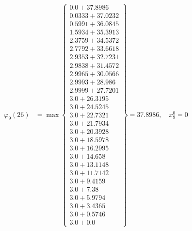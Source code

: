 \documentclass{article}
\begin{document}
\begin{align*}
  
\varphi_{9}(26) &= \max \left\{ \begin{array}{c}
0.0 + 37.8986 \\
 0.0333 + 37.0232 \\
 0.5991 + 36.0845 \\
 1.5934 + 35.3913 \\
 2.3759 + 34.5372 \\
 2.7792 + 33.6618 \\
 2.9353 + 32.7231 \\
 2.9838 + 31.4572 \\
 2.9965 + 30.0566 \\
 2.9993 + 28.986 \\
 2.9999 + 27.7201 \\
 3.0 + 26.3195 \\
 3.0 + 24.5245 \\
 3.0 + 22.7321 \\
 3.0 + 21.7934 \\
 3.0 + 20.3928 \\
 3.0 + 18.5978 \\
 3.0 + 16.2995 \\
 3.0 + 14.658 \\
 3.0 + 13.1148 \\
 3.0 + 11.7142 \\
 3.0 + 9.4159 \\
 3.0 + 7.38 \\
 3.0 + 5.9794 \\
 3.0 + 3.4365 \\
 3.0 + 0.5746 \\
 3.0 + 0.0
\end{array} \right\}=37.8986,\quad x_{9}^0=0\\
  
  
  

\end{align*}
\end{document}
